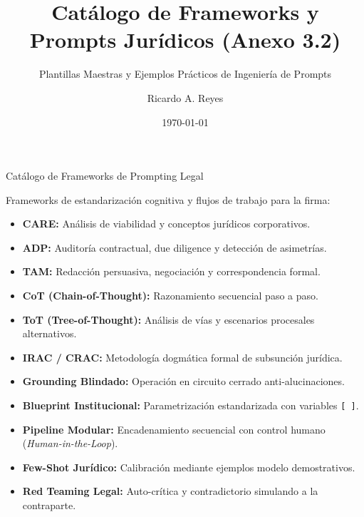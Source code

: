 \documentclass[aspectratio=169]{beamer}
\title[ Catálogo de Frameworks y Prom]{ Catálogo de Frameworks y Prompts Jurídicos (Anexo 3.2)}
\subtitle{ Plantillas Maestras y Ejemplos Prácticos de Ingeniería de Prompts}
\author{Ricardo A. Reyes}
\institute{Universidad de La Sabana}
\date{\today}
\begin{document}
\begin{frame}
  \titlepage
\end{frame}

\usebackgroundtemplate{}


\begin{frame}{Catálogo de Frameworks de Prompting Legal}


Frameworks de estandarización cognitiva y flujos de trabajo para la firma:

\begin{itemize}
  \item \textbf{CARE:} Análisis de viabilidad y conceptos jurídicos corporativos.
  \item \textbf{ADP:} Auditoría contractual, due diligence y detección de asimetrías.
  \item \textbf{TAM:} Redacción persuasiva, negociación y correspondencia formal.
  \item \textbf{CoT (Chain-of-Thought):} Razonamiento secuencial paso a paso.
  \item \textbf{ToT (Tree-of-Thought):} Análisis de vías y escenarios procesales alternativos.
  \item \textbf{IRAC / CRAC:} Metodología dogmática formal de subsunción jurídica.
  \item \textbf{Grounding Blindado:} Operación en circuito cerrado anti-alucinaciones.
  \item \textbf{Blueprint Institucional:} Parametrización estandarizada con variables \texttt{[ ]}.
  \item \textbf{Pipeline Modular:} Encadenamiento secuencial con control humano (\textit{Human-in-the-Loop}).
  \item \textbf{Few-Shot Jurídico:} Calibración mediante ejemplos modelo demostrativos.
  \item \textbf{Red Teaming Legal:} Auto-crítica y contradictorio simulando a la contraparte.
\end{itemize}
\end{frame}
\end{document}
